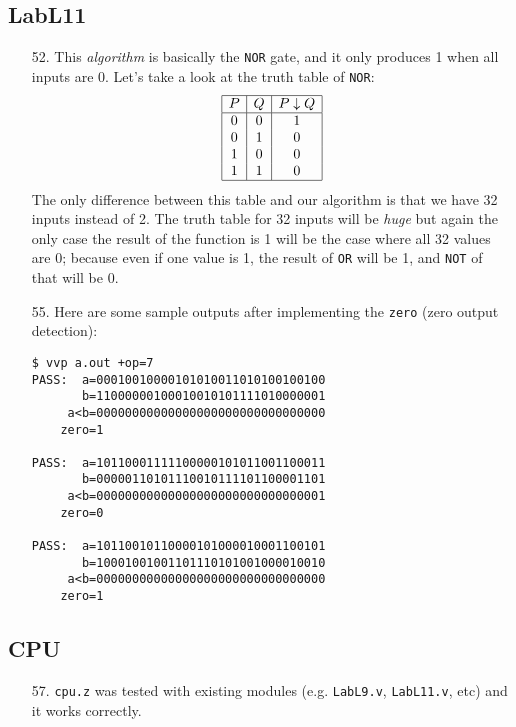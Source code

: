 \documentclass{article}
\begin{document}
\subsection{LabL11}
\begin{enumerate}
\item[52. ] This \textit{algorithm} is basically the \verb$NOR$ gate, and it only produces 1 when all inputs are 0. Let's take a look at the truth table of \verb$NOR$:
\begin{displaymath}
\begin{array}{|c|c|c|}
\hline
   P
 & Q
 & P \downarrow Q \\
\hline
0 & 0 & 1 \\
0 & 1 & 0 \\
1 & 0 & 0 \\
1 & 1 & 0 \\
\hline
\end{array}
\end{displaymath}
The only difference between this table and our algorithm is that we have 32 inputs instead of 2. The truth table for 32 inputs will be \textit{huge} but again the only case the result of the function is 1 will be the case where all 32 values are 0; because even if one value is 1, the result of \verb$OR$ will be 1, and \verb$NOT$ of that will be 0.

\item[55. ] Here are some sample outputs after implementing the \verb$zero$ (zero output detection):
\begin{verbatim}
$ vvp a.out +op=7
PASS:  a=00010010000101010011010100100100
       b=11000000100010010101111010000001
     a<b=00000000000000000000000000000000
    zero=1

PASS:  a=10110001111100000101011001100011
       b=00000110101110010111101100001101
     a<b=00000000000000000000000000000001
    zero=0

PASS:  a=10110010110000101000010001100101
       b=10001001001101110101001000010010
     a<b=00000000000000000000000000000000
    zero=1
\end{verbatim}
\end{enumerate}

\subsection{CPU}
\begin{enumerate}
\item[57. ] \verb$cpu.z$ was tested with existing modules (e.g. \verb$LabL9.v$, \verb$LabL11.v$, etc) and it works correctly.
\end{enumerate}
\end{document}
